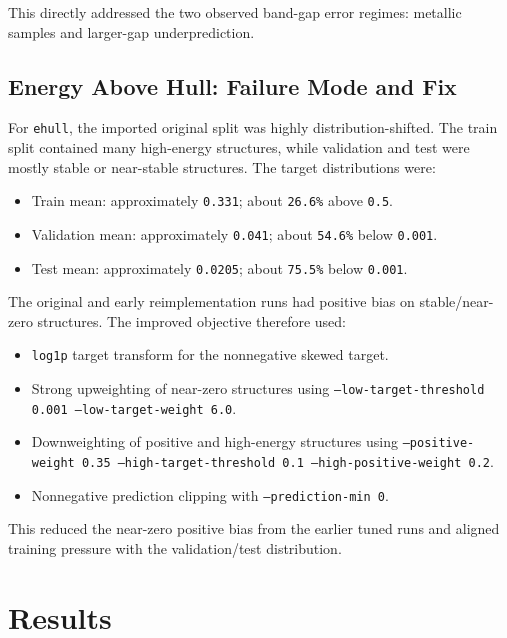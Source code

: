 \documentclass[11pt]{article}
\begin{document}
This directly addressed the two observed band-gap error regimes: metallic samples and larger-gap underprediction.

\subsection{Energy Above Hull: Failure Mode and Fix}

For \texttt{ehull}, the imported original split was highly distribution-shifted.  The train split contained many high-energy structures, while validation and test were mostly stable or near-stable structures.  The target distributions were:
\begin{itemize}
  \item Train mean: approximately \texttt{0.331}; about \texttt{26.6\%} above \texttt{0.5}.
  \item Validation mean: approximately \texttt{0.041}; about \texttt{54.6\%} below \texttt{0.001}.
  \item Test mean: approximately \texttt{0.0205}; about \texttt{75.5\%} below \texttt{0.001}.
\end{itemize}

The original and early reimplementation runs had positive bias on stable/near-zero structures.  The improved objective therefore used:
\begin{itemize}
  \item \texttt{log1p} target transform for the nonnegative skewed target.
  \item Strong upweighting of near-zero structures using \texttt{--low-target-threshold 0.001 --low-target-weight 6.0}.
  \item Downweighting of positive and high-energy structures using \texttt{--positive-weight 0.35 --high-target-threshold 0.1 --high-positive-weight 0.2}.
  \item Nonnegative prediction clipping with \texttt{--prediction-min 0}.
\end{itemize}

This reduced the near-zero positive bias from the earlier tuned runs and aligned training pressure with the validation/test distribution.

\section{Results}
\end{document}
